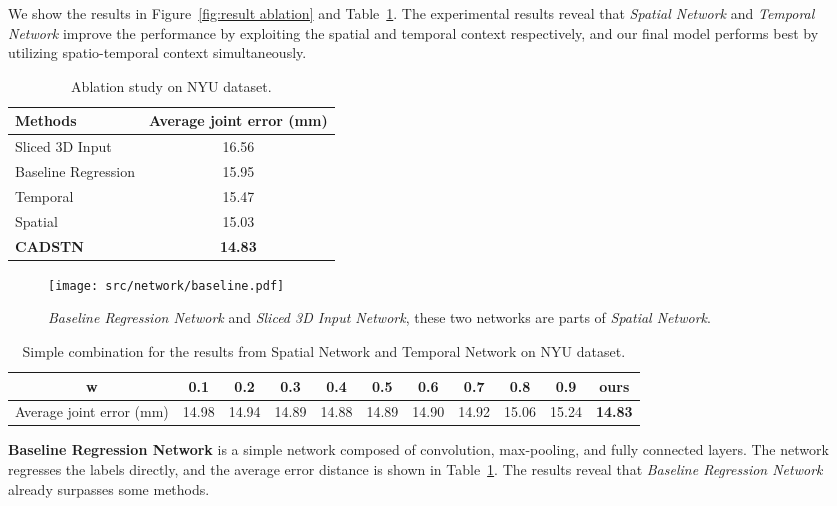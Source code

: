 \documentclass[journal,comsoc]{IEEEtran}
\let\MYoriglatexcaption\caption
\renewcommand{\caption}[2][\relax]{\MYoriglatexcaption[#2]{#2}}
\begin{document}
We show the results in Figure~\ref{fig:result ablation} and Table~\ref{tab:ablation NYU}. The experimental results reveal that \emph{Spatial Network} and
\emph{Temporal Network} improve the performance by exploiting the spatial and temporal context respectively, and our final model
performs best by utilizing spatio-temporal context simultaneously.
\hspace{-3em}
\begin{table}[htbp]
  \centering
  \caption{Ablation study on NYU dataset.}
    \begin{tabular}{|l|c|}
    \hline
    Methods & \multicolumn{1}{l|}{Average joint error (mm)} \\
    \hline
    Sliced 3D Input & 16.56 \\
    Baseline Regression & 15.95 \\
    Temporal & 15.47 \\
    Spatial & 15.03 \\
    \textbf{CADSTN} & \textbf{14.83} \\
    \hline
    \end{tabular}%
  \label{tab:ablation NYU}%
\end{table}%

\hspace{-3em}
\begin{figure}[htbp]
\centering
    \texttt{[image: src/network/baseline.pdf]}
    \caption{\emph{Baseline Regression Network} and \emph{Sliced 3D Input Network},
    these two networks are parts of \emph{Spatial Network}.}
\label{fig:baseline}
\end{figure}

\begin{table*}[t]
\centering
\caption{Simple combination for the results from Spatial Network and Temporal Network on NYU dataset.}
\begin{tabular}{c|c|c|c|c|c|c|c|c|c|c}
    \hline
    w                          &0.1    &0.2 &0.3 &0.4 &0.5 &0.6 &0.7 &0.8 &0.9 &ours\\
    \hline
    Average joint error (mm)   &14.98  &14.94   &14.89   &14.88   &14.89   &14.90   &14.92   &15.06   &15.24   &\textbf{14.83}\\
    \hline
\end{tabular}
\label{tab:ablation_fusion}
\end{table*}
\textbf{Baseline Regression Network} is a simple network composed of convolution, max-pooling, and fully
connected layers. The network regresses the labels directly, and the average error distance is shown in Table~\ref{tab:ablation NYU}. The results
reveal that \emph{Baseline Regression Network} already surpasses some methods.
\end{document}
